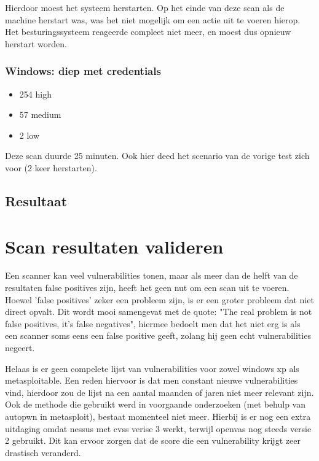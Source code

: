 Hierdoor moest het systeem herstarten. Op het einde van deze scan als de machine herstart was, was het niet mogelijk om een actie uit te voeren hierop. Het besturingssysteem reageerde compleet niet meer, en moest dus opnieuw herstart worden.

\subsubsection{Windows: diep met credentials}

\begin{itemize}
\item 254 high
\item 57 medium
\item 2 low
\end{itemize}

Deze scan duurde 25 minuten. Ook hier deed het scenario van de vorige test zich voor (2 keer herstarten).

\subsection{Resultaat}

\section{Scan resultaten valideren}

Een scanner kan veel vulnerabilities tonen, maar als meer dan de helft van de resultaten false positives zijn, heeft het geen nut om een scan uit te voeren. Hoewel 'false positives' zeker een probleem zijn, is er een groter probleem dat niet direct opvalt. Dit wordt mooi samengevat met de quote: "The real problem is not false positives, it's false negatives", hiermee bedoelt men dat het niet erg is als een scanner soms eens een false positive geeft, zolang hij geen echt vulnerabilities negeert.

Helaas is er geen compelete lijst van vulnerabilities voor zowel windows xp als metasploitable. Een reden hiervoor is dat men constant nieuwe vulnerabilities vind, hierdoor zou de lijst na een aantal maanden of jaren niet meer relevant zijn. Ook de methode die gebruikt werd in voorgaande onderzoeken (met behulp van autopwn in metasploit), bestaat momenteel niet meer. Hierbij is er nog een extra uitdaging omdat nessus met cvss verise 3 werkt, terwijl openvas nog steeds versie 2 gebruikt. Dit kan ervoor zorgen dat de score die een vulnerability krijgt zeer drastisch veranderd. 

